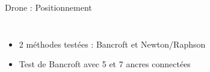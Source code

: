 \begin{frame}[allowframebreaks]{Drone : Positionnement}
\begin{columns}
\begin{column}{0.5\textwidth}
\begin{figure}[H]
                            \caption*{}
                        \end{figure}
                    \end{column}
                \end{columns}
            \end{frame}
%
%
            \begin{frame}[allowframebreaks]
                \begin{block}{}
                    \begin{itemize}
                        [square]
                        \item 2 méthodes testées : Bancroft et Newton/Raphson
                        \item Test de Bancroft avec 5 et 7 ancres connectées
                    \end{itemize}
                \end{block}
                
                \begin{table}[H]
                    \caption*{Résultats obtenus avec 5 et 7 ancres sur le positionnement avec Bancroft}
                \end{table}
            \end{frame}

